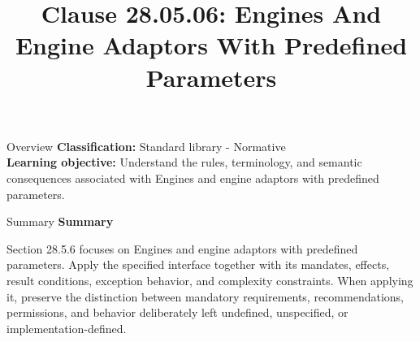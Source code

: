 \documentclass[10pt,letterpaper]{article}
\title{Clause 28.05.06: Engines And Engine Adaptors With Predefined Parameters}
\author{}
\date{}
\begin{document}
\maketitle
\begin{CornellOverviewBox}{Overview}
\textbf{Classification:} Standard library - Normative\\[2pt]
\textbf{Learning objective:} Understand the rules, terminology, and semantic consequences associated with Engines and engine adaptors with predefined parameters.
\end{CornellOverviewBox}\begin{CornellSummaryBox}{Summary}
{\sffamily\bfseries\color{Accent} Summary}\par\vspace{3pt}Section 28.5.6 focuses on Engines and engine adaptors with predefined parameters. Apply the specified interface together with its mandates, effects, result conditions, exception behavior, and complexity constraints. When applying it, preserve the distinction between mandatory requirements, recommendations, permissions, and behavior deliberately left undefined, unspecified, or implementation-defined.
\end{CornellSummaryBox}
\end{document}
